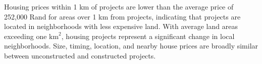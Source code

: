 \documentclass[12pt]{article}
\begin{document}
Housing prices within 1 km of projects are lower than the average price of 252,000 Rand for areas over 1 km from projects, indicating that projects are located in neighborhoods with less expensive land.  With average land areas exceeding one $\text{km}^{2}$, housing projects represent a significant change in local neighborhoods.  Size, timing, location, and nearby house prices are broadly similar between unconstructed and constructed projects.  

\end{document}
